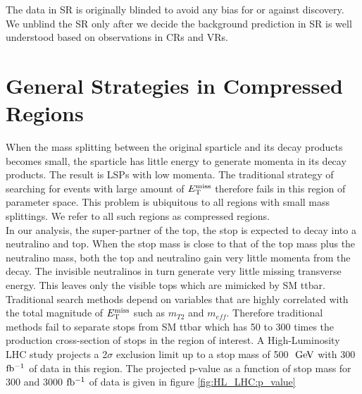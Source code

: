 \indent The data in SR is originally blinded to avoid any bias for or against discovery.  We unblind the SR only after we decide the background prediction in SR is well understood based on observations in CRs and VRs. \\

\section{General Strategies in Compressed Regions}

\indent When the mass splitting between the original sparticle and its decay products becomes small, the sparticle has little energy to generate momenta in its decay products.  The result is LSPs with low momenta.  The traditional strategy of searching for events with large amount of $E_{\mathrm{T}}^{\mathrm{miss}}$ therefore fails in this region of parameter space.  This problem is ubiquitous to all regions with small mass splittings.  We refer to all such regions as compressed regions.  ~\\

\indent  In our analysis, the super-partner of the top, the stop is expected to decay into a neutralino and top.  When the stop mass is close to that of the top mass plus the neutralino mass, both the top and neutralino gain very little momenta from the decay.  The invisible neutralinos in turn generate very little missing transverse energy.  This leaves only the visible tops which are mimicked by SM ttbar. \\

\indent Traditional search methods depend on variables that are highly correlated with the total magnitude of $E_{\mathrm{T}}^{\mathrm{miss}}$ such as $m_{T2}$ and $m_{eff}$.  Therefore traditional methods fail to separate stops from SM ttbar which has 50 to 300 times the production cross-section of stops in the region of interest.  A High-Luminosity LHC study projects a 2$\sigma$ exclusion limit up to a stop mass of 500 $\gev$ with 300 $\mbox{fb$^{-1}$}$ of data in this region.\cite{HLLHC_stop} The projected p-value as a function of stop mass for 300 and 3000 $\mbox{fb$^{-1}$}$ of data is given in figure \ref{fig:HL_LHC:p_value} \\

